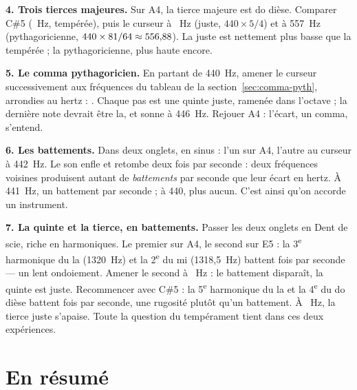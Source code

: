 \documentclass[a4paper,11pt]{article}
\newcommand{\touche}[1]{\textsf{\small #1}}   %
\begin{document}
\begin{ecoute}
\textbf{4. Trois tierces majeures.} Sur \touche{A4}, la tierce majeure est do
dièse. Comparer \touche{C\#5} (\doDSynth~Hz, tempérée), puis le curseur à
\doDJuste~Hz (juste, $440 \times 5/4$) et à 557~Hz (pythagoricienne,
$440 \times 81/64 \approx 556{,}88$). La juste est nettement plus basse que la
tempérée ; la pythagoricienne, plus haute encore.
\end{ecoute}

\begin{ecoute}
\textbf{5. Le comma pythagoricien.} En partant de 440~Hz, amener le curseur
successivement aux fréquences du tableau de la section~\ref{sec:comma-pyth},
arrondies au hertz : \spiraleArrondie. Chaque pas est une quinte juste, ramenée dans l'octave ; la dernière
note devrait être la, et sonne à 446~Hz. Rejouer \touche{A4} : l'écart, un
comma, s'entend.
\end{ecoute}

\begin{ecoute}
\textbf{6. Les battements.} Dans deux onglets, en sinus : l'un sur
\touche{A4}, l'autre au curseur à 442~Hz. Le son enfle et retombe deux fois
par seconde : deux fréquences voisines produisent autant de
\emph{battements} par seconde que leur écart en hertz. À 441~Hz, un battement
par seconde ; à 440, plus aucun. C'est ainsi qu'on accorde un instrument.
\end{ecoute}

\begin{ecoute}
\textbf{7. La quinte et la tierce, en battements.} Passer les deux onglets en
\touche{Dent de scie}, riche en harmoniques. Le premier sur \touche{A4}, le
second sur \touche{E5} : la 3\textsuperscript{e} harmonique du la (1320~Hz) et
la 2\textsuperscript{e} du mi (1318,5~Hz) battent \battQuinte{} fois par
seconde --- un lent ondoiement. Amener le second à \miJuste~Hz : le battement
disparaît, la quinte est juste. Recommencer avec \touche{C\#5} : la
5\textsuperscript{e} harmonique du la et la 4\textsuperscript{e} du do dièse
battent \battTierce{} fois par seconde, une rugosité plutôt qu'un battement.
À \doDJuste~Hz, la tierce juste s'apaise. Toute la question du tempérament
tient dans ces deux expériences.
\end{ecoute}

\clearpage
\section{En résumé}
\label{sec:resume}
\end{document}
